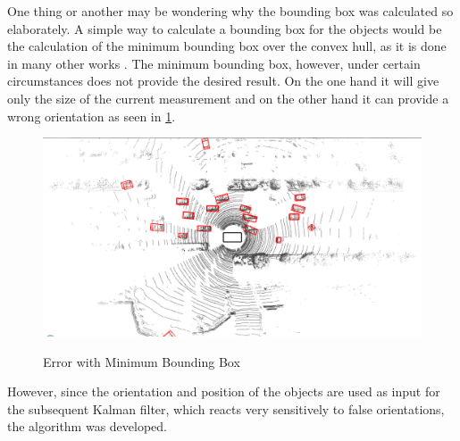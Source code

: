 \documentclass[11pt,oneside,openright]{mpreport}
\begin{document}

One thing or another may be wondering why the bounding box was calculated so elaborately. A simple way to calculate a bounding box for the
objects would be the calculation of the minimum bounding box over the convex hull, as it is done in many other works \cite{Zhang, Himmelsbach2009}.
The minimum bounding box, however, under certain circumstances does not provide the desired result. On the one hand it will give only the size of the current measurement and on the 
other hand it can provide a wrong orientation as seen in \cref{min_box}.

\begin{figure}[!ht]
\caption{Error with Minimum Bounding Box \cite{Zhang}}
\includegraphics[width=\textwidth]{bilder/min_bound_wrong.png}
\label{min_box}
\end{figure}


However, since the orientation and position of the objects are used as input for the subsequent Kalman filter, which reacts very sensitively to false orientations, the algorithm was developed.
\end{document}
